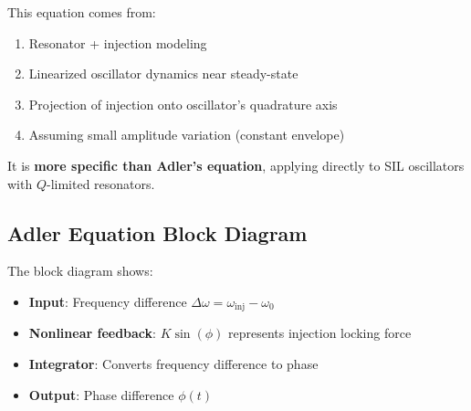 \documentclass{article}
\begin{document}
This equation comes from:
\begin{enumerate}
    \item Resonator + injection modeling
    \item Linearized oscillator dynamics near steady-state
    \item Projection of injection onto oscillator's quadrature axis
    \item Assuming small amplitude variation (constant envelope)
\end{enumerate}

It is \textbf{more specific than Adler's equation}, applying directly to SIL oscillators with $Q$-limited resonators.

\subsection{Adler Equation Block Diagram}


The block diagram shows:
\begin{itemize}
    \item \textbf{Input}: Frequency difference $\Delta \omega = \omega_{\text{inj}} - \omega_0$
    \item \textbf{Nonlinear feedback}: $K\sin(\phi)$ represents injection locking force
    \item \textbf{Integrator}: Converts frequency difference to phase
    \item \textbf{Output}: Phase difference $\phi(t)$
\end{itemize}
\end{document}
